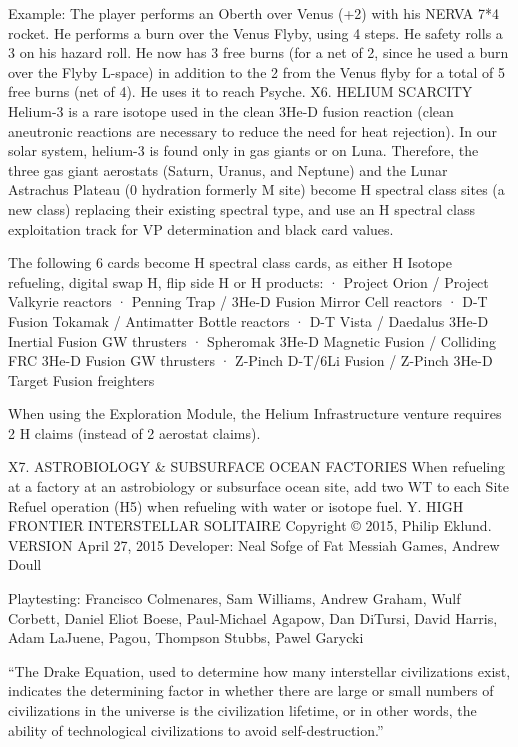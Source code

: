 \documentclass[a4paper]{book}
\begin{document}
Example: The player performs an Oberth over Venus (+2) with his NERVA 7*4 rocket. He performs a burn over the Venus Flyby, using 4 steps. He safety rolls a 3 on his hazard roll. He now has 3 free burns (for a net of 2, since he used a burn over the Flyby L-space) in addition to the 2 from the Venus flyby for a total of 5 free burns (net of 4). He uses it to reach Psyche.
X6. HELIUM SCARCITY
Helium-3 is a rare isotope used in the clean 3He-D fusion reaction (clean aneutronic reactions are necessary to reduce the need for heat rejection). In our solar system, helium-3 is found only in gas giants or on Luna. Therefore, the three gas giant aerostats (Saturn, Uranus, and Neptune) and the Lunar Astrachus Plateau (0 hydration formerly M site) become H spectral class sites (a new class) replacing their existing spectral type, and use an H spectral class exploitation track for VP determination and black card values.

The following 6 cards become H spectral class cards, as either H Isotope refueling, digital swap H, flip side H or H products:
·   	Project Orion / Project Valkyrie reactors
·   	Penning Trap / 3He-D Fusion Mirror Cell reactors
·   	D-T Fusion Tokamak / Antimatter Bottle reactors
·   	D-T Vista / Daedalus 3He-D Inertial Fusion GW thrusters
·   	Spheromak 3He-D Magnetic Fusion / Colliding FRC 3He-D Fusion GW thrusters
·   	Z-Pinch D-T/6Li Fusion / Z-Pinch 3He-D Target Fusion freighters

When using the Exploration Module, the Helium Infrastructure venture requires 2 H claims (instead of 2 aerostat claims).

X7. ASTROBIOLOGY \& SUBSURFACE OCEAN FACTORIES
When refueling at a factory at an astrobiology or subsurface ocean site, add two WT to each Site Refuel operation (H5) when refueling with water or isotope fuel. 
Y. HIGH FRONTIER INTERSTELLAR SOLITAIRE
Copyright © 2015, Philip Eklund. VERSION April 27, 2015
Developer: Neal Sofge of Fat Messiah Games, Andrew Doull
 
Playtesting: Francisco Colmenares, Sam Williams, Andrew Graham, Wulf Corbett, Daniel Eliot Boese, Paul-Michael Agapow, Dan DiTursi, David Harris, Adam LaJuene, Pagou, Thompson Stubbs, Pawel Garycki
 
“The Drake Equation, used to determine how many interstellar civilizations exist, indicates the determining factor in whether there are large or small numbers of civilizations in the universe is the civilization lifetime, or in other words, the ability of technological civilizations to avoid self-destruction.”
 
\end{document}
